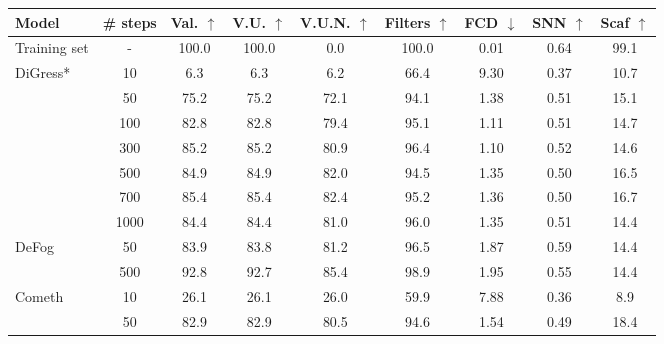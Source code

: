 \begin{table}[h!]
\centering

\resizebox{\textwidth}{!}
{

\begin{tabular}{l|c|ccccccc}

\toprule

Model & 
\# steps &
Val. $\uparrow$ & 
V.U. $\uparrow$ & 
V.U.N. $\uparrow$ & 
Filters $\uparrow$ & 
FCD $\downarrow$ & 
SNN $\uparrow$ & 
Scaf $\uparrow$ \\

\midrule

Training set & 
- & %
100.0 & %
100.0 & %
0.0 & %
100.0 & %
0.01 & %
0.64 & %
99.1 \\ %

\midrule

\multirow{7}{*}{DiGress* \citep{digress}}& 
10 &
6.3&
6.3 & 
6.2 & 
66.4 &
9.30 &
0.37 &
10.7 \\

&
50 &
75.2 &
75.2  & 
72.1 & 
94.1 &
1.38 &
0.51 &
15.1 \\

&
100 &
82.8 &
82.8 & 
79.4 & 
95.1  &
1.11 &
0.51 &
14.7 \\

&
300 &
85.2 &
85.2 & 
80.9 & 
96.4 &
1.10 &
0.52 &
14.6 \\

&
500 &
84.9 &
84.9 &
82.0 &
94.5 &
1.35 &
0.50 &
16.5 \\

&
700 &
85.4 &
85.4 & 
82.4 & 
95.2 &
1.36 &
0.50 &
16.7 \\

&
1000 &
84.4 &
84.4 & 
81.0 & 
96.0 &
1.35 &
0.51 &
14.4 \\

\midrule

\multirow{2}{*}{DeFog \citep{defog}} &
50 &
83.9 &
83.8 & 
81.2 & 
96.5 &
1.87 &
0.59 &
14.4 \\

&
500 &
92.8 &
92.7 & 
85.4 & 
98.9 &
1.95 &
0.55 &
14.4 \\

\midrule


\multirow{7}{*}{Cometh \citep{cometh}} &
10 &
26.1 &
26.1 & 
26.0 & 
59.9 &
7.88 &
0.36 &
8.9 \\

&
50 &
82.9 &
82.9 & 
80.5 & 
94.6 &
1.54 &
0.49 &
18.4 \\


\end{tabular}}
\end{table}
